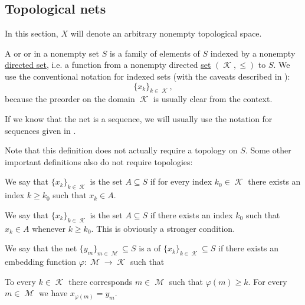 \subsection{Topological nets}\label{subsec:topological_nets}

In this section, \( X \) will denote an arbitrary nonempty topological space.

\begin{definition}\label{def:topological_net}
  A  or  or  in a nonempty set \( S \) is a family of elements of \( S \) indexed by a nonempty \hyperref[def:indexed_family]{directed set}, i.e. a function from a nonempty directed \hyperref[def:directed_set]{set} \( (\mscrK, \leq) \) to \( S \). We use the conventional notation for indexed sets (with the caveats described in ):
  \begin{equation*}
    \{ x_k \}_{k \in \mscrK},
  \end{equation*}
  because the preorder on the domain \( \mscrK \) is usually clear from the context.

  If we know that the net is a sequence, we will usually use the notation for sequences given in .

  Note that this definition does not actually require a topology on \( S \). Some other important definitions also do not require topologies:
  \begin{thmenum}
     We say that \( \{ x_k \}_{k \in \mscrK} \) is  the set \( A \subseteq S \) if for every index \( k_0 \in \mscrK \) there exists an index \( k \geq k_0 \) such that \( x_k \in A \).

     We say that \( \{ x_k \}_{k \in \mscrK} \) is  the set \( A \subseteq S \) if there exists an index \( k_0 \) such that \( x_k \in A \) whenever \( k \geq k_0 \). This is obviously a stronger condition.

    We say that the net \( \{ y_m \}_{m \in \mscrM} \subseteq S \) is a  of \( \{ x_k \}_{k \in \mscrK} \subseteq S \) if there exists an embedding function \( \varphi: \mscrM \to \mscrK \) such that
    \begin{thmenum}
       To every \( k \in \mscrK \) there corresponds \( m \in \mscrM \) such that \( \varphi(m) \geq k \).
       For every \( m \in \mscrM \) we have \( x_{\varphi(m)} = y_m \).
    \end{thmenum}
  \end{thmenum}
\end{definition}

